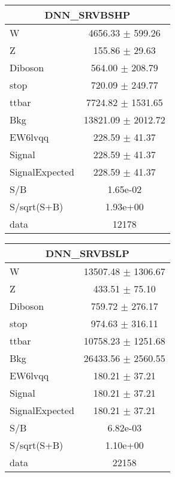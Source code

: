 \begin{table}[ht]
\centering
\small
\begin{tabular}{|l|c|}
\hline
\multicolumn{2}{|c|}{DNN\_SRVBSHP} \\ \hline
W & 4656.33 $\pm$ 599.26\\
Z & 155.86 $\pm$ 29.63\\
Diboson & 564.00 $\pm$ 208.79\\
stop & 720.09 $\pm$ 249.77\\
ttbar & 7724.82 $\pm$ 1531.65\\
\hline
Bkg & 13821.09 $\pm$ 2012.72\\
\hline
EW6lvqq & 228.59 $\pm$ 41.37\\
\hline
Signal & 228.59 $\pm$ 41.37\\
SignalExpected & 228.59 $\pm$ 41.37\\
\hline
S/B & 1.65e-02\\
S/sqrt(S+B) & 1.93e+00\\
\hline
data & 12178\\ \hline
\end{tabular}
\begin{tabular}{|l|c|}
\hline
 \multicolumn{2}{|c|}{DNN\_SRVBSLP}\\ \hline
W & 13507.48 $\pm$ 1306.67\\
Z & 433.51 $\pm$ 75.10\\
Diboson & 759.72 $\pm$ 276.17\\
stop & 974.63 $\pm$ 316.11\\
ttbar & 10758.23 $\pm$ 1251.68\\
\hline
Bkg & 26433.56 $\pm$ 2560.55\\
\hline
EW6lvqq & 180.21 $\pm$ 37.21\\
\hline
Signal & 180.21 $\pm$ 37.21\\
SignalExpected & 180.21 $\pm$ 37.21\\
\hline
S/B & 6.82e-03\\
S/sqrt(S+B) & 1.10e+00\\
\hline
data & 22158\\ \hline
\end{tabular}

\end{table}

